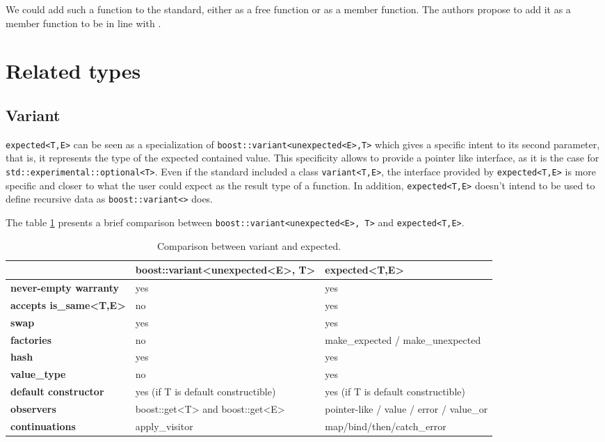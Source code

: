 \documentclass[a4paper,10pt]{article}
\newcommand{\cpp}[1]{\lstinline{#1}}
\begin{document}
We could add such a function to the standard, either as a free function or as a member function. The authors propose to add it as a member function to be in line with \cite{ImprovementsAsync}.

\section{Related types}

\subsection{Variant}

\cpp{expected<T,E>} can be seen as a specialization of  \cpp{boost::variant<unexpected<E>,T>} which gives a specific intent to its second parameter, that is, it represents the type of the expected contained value. This specificity allows to provide a pointer like interface, as it is the case for \cpp{std::experimental::optional<T>}. Even if the standard included a class  \cpp{variant<T,E>}, the interface provided by \cpp{expected<T,E>} is more specific and closer to what the user could expect as the result type of a function. In addition, \cpp{expected<T,E>} doesn't intend to be used to define recursive data as \cpp{boost::variant<>} does.

The table \ref{comp-variant} presents a brief comparison between \cpp{boost::variant<unexpected<E>, T>} and \cpp{expected<T,E>}.

\begin{table}[h!]
\bgroup
\def\arraystretch{1.5}
\begin{tabular}
{|l|>{\raggedright\arraybackslash}p{6cm}|>{\raggedright\arraybackslash}p{6cm}|}
\hline
                    & \textbf{boost::variant<unexpected<E>, T>} & \textbf{expected<T,E>}  \\
\hline
\textbf{never-empty warranty} & yes & yes \\
\hline
\textbf{accepts is_same<T,E>} & no & yes \\
\hline
\textbf{swap} & yes & yes \\
\hline
\textbf{factories} & no & make\_expected / make\_unexpected  \\
\hline
\textbf{hash} & yes & yes  \\
\hline
\textbf{value_type} & no & yes  \\
\hline
\textbf{default constructor} & yes (if T is default constructible) & yes (if T is default constructible)  \\
\hline
\textbf{observers} & boost::get<T> and boost::get<E> & pointer-like / value / error / value_or \\
\hline
\textbf{continuations} & apply_visitor & map/bind/then/catch_error  \\
\hline
\end{tabular}
\egroup
\caption{Comparison between variant and expected.}
\label{comp-variant}
\end{table}
\end{document}
